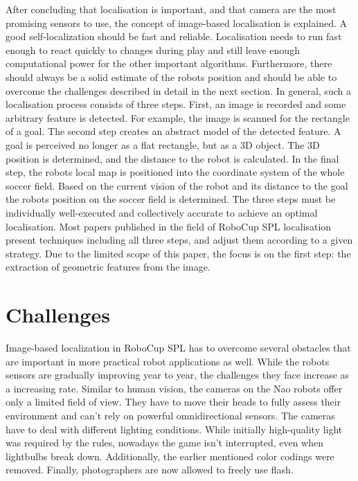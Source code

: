\documentclass[12pt, a4paper, doc]{apa6}
\begin{document}
  After concluding that localisation is important, and that camera are the most promising sensors to use, the concept of image-based localisation is explained. A good self-localization should be fast and reliable. Localisation needs to run fast enough to react quickly to changes during play and still leave enough computational power for the other important algorithms. Furthermore, there should always be a solid estimate of the robots position and should be able to overcome the challenges described in detail in the next section. In general, such a localisation process consists of three steps. First, an image is recorded and some arbitrary feature is detected. For example, the image is scanned for the rectangle of a goal. The second step creates an abstract model of the detected feature. A goal is perceived no longer as a flat rectangle, but as a 3D object. The 3D position is determined, and the distance to the robot is calculated. In the final step, the robots local map is positioned into the coordinate system of the whole soccer field. Based on the current vision of the robot and its distance to the goal the robots position on the soccer field is determined. The three steps must be individually well-executed and collectively accurate to achieve an optimal localisation. Most papers published in the field of RoboCup SPL localisation present techniques including all three steps, and adjust them according to a given strategy. Due to the limited scope of this paper, the focus is on the first step: the extraction of geometric features from the image.

  \section{Challenges}
  Image-based localization in RoboCup SPL has to overcome several obstacles that are important in more practical robot applications as well. While the robots sensors are gradually improving year to year, the challenges they face increase as a increasing rate. Similar to human vision, the cameras on the Nao robots offer only a limited field of view. They have to move their heads to fully assess their environment and can't rely on powerful omnidirectional sensors. The cameras have to deal with different lighting conditions. While initially high-quality light was required by the rules, nowadays the game isn't interrupted, even when lightbulbs break down. Additionally, the earlier mentioned color codings were removed. Finally, photographers are now allowed to freely use flash.
\end{document}
